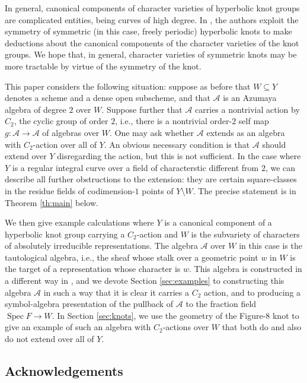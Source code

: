 \documentclass[reqno,oneside,dvipsnames,pdfnames,final]{amsart}
\theoremstyle{definition}
\DeclareMathOperator{\Spec}{Spec}
\newcommand{\sh}[1]{\mathcal{#1}}
\newcommand{\sm}{\setminus}
\begin{document}
In general, canonical components of character varieties of hyperbolic knot groups are complicated entities, being curves of high degree. In \cite{Boyle2024}, the authors exploit the symmetry of symmetric (in this case, freely periodic) hyperbolic knots to make deductions about the canonical components of the character varieties of the knot groups. We hope that, in general, character varieties of symmetric knots may be more tractable by virtue of the symmetry of the knot.

This paper considers the following situation: suppose as before that $W \subseteq Y$ denotes a scheme and a dense open subscheme, and that $\sh A$ is an Azumaya algebra of degree $2$ over $W$. Suppose further that $\sh A$ carries a nontrivial action by $C_2$, the cyclic group of order $2$, i.e.,  there is a nontrivial order-$2$ self map $g: \sh A \to \sh A$ of algebras over $W$. One may ask whether $\sh A$ extends as an algebra with $C_2$-action over all of $Y$. An obvious necessary condition is that $\sh A$ should extend over $Y$ disregarding the action, but this is not sufficient. In the case where $Y$ is a regular integral curve over a field of characterstic different from $2$, we can describe all further obstructions to the extension: they are certain square-classes in the residue fields of codimension-$1$ points of $Y \sm W$. The precise statement is in Theorem \ref{th:main} below.

We then give example calculations where $Y$ is a canonical component of a hyperbolic knot group carrying a $C_2$-action and $W$ is the subvariety of characters of absolutely irreducible representations. The algebra $\sh A$ over $W$ in this case is the tautological algebra, i.e., the sheaf whose stalk over a geometric point $w$ in $W$ is the target of a representation whose character is $w$. This algebra is constructed in a different way in \cite[Prop.\ 4.1]{Chinburg2020}, and we devote Section \ref{sec:examples} to constructing this algebra  $\sh A$ in such a way that it is clear it carries a $C_2$ action, and to producing a symbol-algebra presentation of the pullback of $\sh A$ to the fraction field $\Spec F \to W$. In Section \ref{sec:knots}, we use the geometry of the Figure-8 knot to give an example of such an algebra with $C_2$-actions over $W$ that both do and also do not extend over all of $Y$.

\subsection*{Acknowledgements}
\label{sec:acknowledgments}
\end{document}

